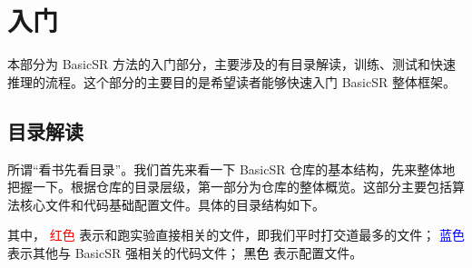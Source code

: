 \documentclass[../main.tex]{subfiles}
\begin{document}
\chapter{入门}
\vspace{-2cm}

本部分为 BasicSR 方法的入门部分，主要涉及的有目录解读，训练、测试和快速推理的流程。这个部分的主要目的是希望读者能够快速入门 BasicSR 整体框架。

\section{目录解读}\label{getting_start:content-overview}

所谓“看书先看目录”。我们首先来看一下 BasicSR 仓库的基本结构，先来整体地把握一下。根据仓库的目录层级，第一部分为仓库的整体概览。这部分主要包括算法核心文件和代码基础配置文件。具体的目录结构如下。

其中，\newline
\noindent\textcolor{red}{红色} 表示和跑实验直接相关的文件，即我们平时打交道最多的文件；\newline
\noindent\textcolor{blue}{蓝色} 表示其他与 BasicSR 强相关的代码文件；\newline
\noindent\textcolor{black}{黑色} 表示配置文件。
\end{document}
